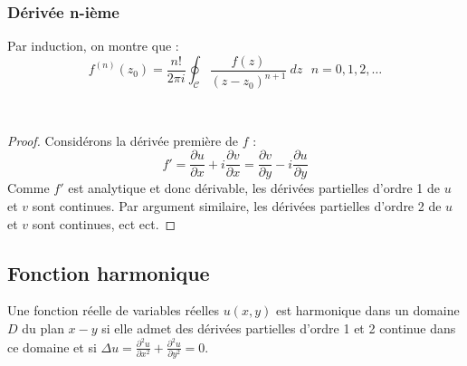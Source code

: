 		
\subsubsection{Dérivée n-ième}
Par induction, on montre que :
\begin{equation}
	f^{(n)}(z_0) = \frac{n!}{2\pi i}\oint_\mathcal{C}\frac{f(z)}{(z-z_0)^{n+1}}\ dz\ \ \ n=0,1,
	2,\dots
\end{equation}
		
\ \ \\
		
\begin{proof}
	Considérons la dérivée première de $f$ :
	\begin{equation}
		f' = \frac{\partial u}{\partial x} + i \frac{\partial v}{\partial x} = \frac{\partial v}{\partial
			y} - i \frac{\partial u}{\partial y}
	\end{equation}
	Comme $f'$ est analytique et donc dérivable, les dérivées partielles d'ordre 1 de $u$ et $v$ 
	sont continues. Par argument similaire, les dérivées partielles d'ordre 2 de $u$ et $v$ sont
	continues, ect ect.
\end{proof}

\subsection{Fonction harmonique}
Une fonction réelle de variables réelles $u(x,y)$ est harmonique dans un domaine $D$ du plan $x-
y$ si elle admet des dérivées partielles d'ordre 1 et 2 continue dans ce domaine et si $\Delta u
= \frac{\partial^2u}{\partial x^2}+\frac{\partial^2u}{\partial y^2} = 0$.\\
	
